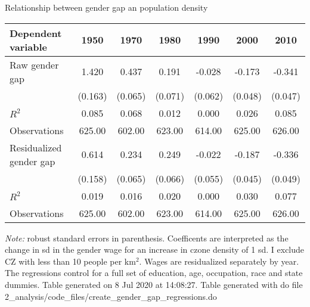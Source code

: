 \begin{center}
\begin{threeparttable}[!h]
\caption{Relationship between gender gap an population density}
\begin{tabular}{lcccccc}
\toprule
\toprule
\textbf{Dependent variable}&\multicolumn{1}{c}{\textbf{1950}}&\multicolumn{1}{c}{\textbf{1970}}&\multicolumn{1}{c}{\textbf{1980}}&\multicolumn{1}{c}{\textbf{1990}}&\multicolumn{1}{c}{\textbf{2000}}&\multicolumn{1}{c}{\textbf{2010}} \\
\midrule
Raw gender gap      &       1.420\sym{***}&       0.437\sym{***}&       0.191\sym{**} &      -0.028         &      -0.173\sym{***}&      -0.341\sym{***}\\
                    &     (0.163)         &     (0.065)         &     (0.071)         &     (0.062)         &     (0.048)         &     (0.047)         \\
\midrule $ R^2$     &       0.085         &       0.068         &       0.012         &       0.000         &       0.026         &       0.085         \\
Observations        &      625.00         &      602.00         &      623.00         &      614.00         &      625.00         &      626.00         \\
\midrule Residualized gender gap&       0.614\sym{***}&       0.234\sym{***}&       0.249\sym{***}&      -0.022         &      -0.187\sym{***}&      -0.336\sym{***}\\
                    &     (0.158)         &     (0.065)         &     (0.066)         &     (0.055)         &     (0.045)         &     (0.049)         \\
\midrule $ R^2$     &       0.019         &       0.016         &       0.020         &       0.000         &       0.030         &       0.077         \\
Observations        &      625.00         &      602.00         &      623.00         &      614.00         &      625.00         &      626.00         \\
\bottomrule
\bottomrule
\end{tabular}
\begin{tablenotes}
\item \footnotesize \textit{Note:} robust standard errors in parenthesis. Coefficents are interpreted as the change in sd in the gender wage for an increase in czone density of 1 sd. I exclude CZ with less than 10 people per km$^2$. Wages are residualized separately by year. The regressions control for a full set of education, age, occupation, race and state dummies. Table generated on  8 Jul 2020 at 14:08:27. Table generated with do file 2\_analysis/code\_files/create\_gender\_gap\_regressions.do
\end{tablenotes}
\end{threeparttable}
\end{center}
